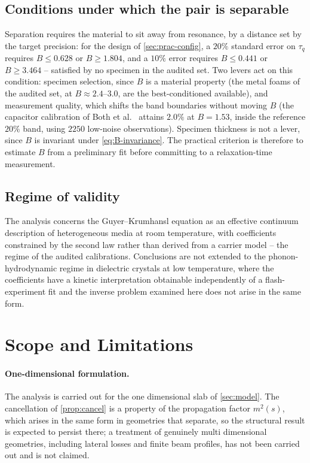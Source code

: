 \documentclass[preprint,12pt,a4paper]{elsarticle}
\theoremstyle{plain}
\theoremstyle{definition}
\theoremstyle{remark}
\newcommand{\tq}{\tau_{q}}
\newcommand{\Bnum}{B}
\begin{document}
\subsection{Conditions under which the pair is separable}
\label{sec:disc-separable}

Separation requires the material to sit away from resonance, by a distance
set by the target precision: for the design of \cref{sec:prac-config}, a
$20\%$ standard error on $\tq$ requires $\Bnum\leq0.628$ or
$\Bnum\geq1.804$, and a $10\%$ error requires $\Bnum\leq0.441$ or
$\Bnum\geq3.464$ -- satisfied by no specimen in the audited set. Two levers
act on this condition: specimen selection, since $\Bnum$ is a material
property (the metal foams of the audited set, at $\Bnum\approx2.4$--$3.0$,
are the best-conditioned available), and measurement quality, which shifts
the band boundaries without moving $\Bnum$ (the capacitor calibration of
Both et al.\ \cite{Both2016} attains $2.0\%$ at $\Bnum=1.53$, inside the
reference $20\%$ band, using $2250$ low-noise observations). Specimen
thickness is not a lever, since $\Bnum$ is invariant under
\eqref{eq:B-invariance}. The practical criterion is therefore to estimate
$\Bnum$ from a preliminary fit before committing to a relaxation-time
measurement.

\subsection{Regime of validity}
\label{sec:disc-regime}

The analysis concerns the Guyer--Krumhansl equation as an effective continuum
description of heterogeneous media at room temperature, with coefficients
constrained by the second law rather than derived from a carrier model
\cite{Van2001,Van2017} -- the regime of the audited calibrations.
Conclusions are not extended to the phonon-hydrodynamic regime in dielectric
crystals at low temperature, where the coefficients have a kinetic
interpretation obtainable independently of a flash-experiment fit and the
inverse problem examined here does not arise in the same form.

\section{Scope and Limitations}
\label{sec:limitations}

\paragraph{One-dimensional formulation.}
The analysis is carried out for the one dimensional slab of \cref{sec:model}.
The cancellation of \cref{prop:cancel} is a property of the propagation factor
$m^{2}(s)$, which arises in the same form in geometries that separate, so the
structural result is expected to persist there; a treatment of genuinely
multi dimensional geometries, including lateral losses and finite beam
profiles, has not been carried out and is not claimed.
\end{document}
